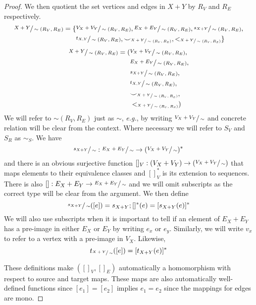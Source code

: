 \begin{proof}
We then quotient the set vertices and edges in $X + Y$ by $R_{V}$ and $R_{E}$ respectively.
\ifdefined \ONECOLUMN
\begin{align*}
    \sfrac{X + Y}{\sim (R_{V},R_{E})} = \{
        &\sfrac{V_{X} + V_{Y}}{\sim (R_{V},R_{E})}, \sfrac{E_{X} + E_{Y}}{\sim (R_{V},R_{E})}, \sfrac{s_{X+Y}}{\sim (R_{V},R_{E})},\\
        &\sfrac{t_{X,Y}}{\sim (R_{V},R_{E})}, {\smile}_{\sfrac{X+Y}{\sim (R_{V},R_{E})}}, <_{\sfrac{X + Y}{\sim (R_{V},R_{E})}}\}    
\end{align*}
\else
    \begin{align*}
        \sfrac{X + Y}{\sim (R_{V},R_{E})} = (&
            \sfrac{V_{X} + V_{Y}}{\sim (R_{V},R_{E})},\\
            &\sfrac{E_{X} + E_{Y}}{\sim (R_{V},R_{E})},\\
            &\sfrac{s_{X+Y}}{\sim (R_{V},R_{E})},\\
            &\sfrac{t_{X,Y}}{\sim (R_{V},R_{E})},\\
            &{\smile}_{\sfrac{X+Y}{\sim (R_{V},R_{E})}},\\
            &<_{\sfrac{X + Y}{\sim (R_{V},R_{E})}})    
    \end{align*}
\fi
We will refer to $\sim (R_{V},R_{E})$ just as $\sim$, \textit{e.g.}, by writing $\sfrac{V_{X} + V_{Y}}{\sim}$ and concrete relation will be clear from the context.
Where necessary we will refer to $S_{V}$ and $S_{R}$ as $\sim_{S}$.
We have 
\[
    \sfrac{s_{X+Y}}{\sim} : \sfrac{E_{X} + E_{Y}}{\sim} \to (\sfrac{V_{X} + V_{Y}}{\sim})^{*}
\]
and there is an obvious surjective function $[]_{V} : (V_{X} + V_{Y}) \to (\sfrac{V_{X} + V_{Y}}{\sim})$ that maps elements to their equivalence classes and $[]_{V}^{*}$ is its extension to sequences.
There is also $[] : E_{X} + E_{Y} \to \sfrac{E_{X} + E_{Y}}{\sim}$ and we will omit subscripts as the correct type will be clear from the argument.
We then define 
\[
    \sfrac{s_{X+Y}}{\sim}([e]) = s_{X+Y};[]^{*}(e) = [s_{X+Y}(e)]^{*}
\]
We will also use subscripts when it is important to tell if an element of $E_{X} + E_{Y}$ has a pre-image in either $E_{X}$ or $E_{Y}$ by writing $e_{x}$ or $e_{y}$.
Similarly, we will write $v_{x}$ to refer to a vertex with a pre-image in $V_{X}$.
Likewise, 
\[
    t_{\sfrac{X+Y}{\sim}}([e]) = [t_{X+Y}(e)]^{*}
\]

These definitions make $([]_{V},[]_{E})$ automatically a homomorphism with respect to source and target maps.
These maps are also automatically well-defined functions since $[e_1] = [e_2]$ implies $e_1 = e_2$ since the mappings for edges are mono.


\end{proof}
